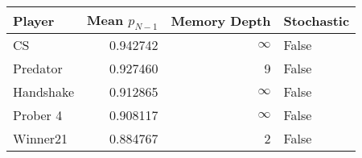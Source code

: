 \begin{tabular}{lrrl}
\toprule
    Player &  Mean $p_{N-1}$ &  Memory Depth & Stochastic \\
\midrule
        CS &        0.942742 &            \(\infty\) &      False \\
  Predator &        0.927460 &             9 &      False \\
 Handshake &        0.912865 &            \(\infty\) &      False \\
  Prober 4 &        0.908117 &            \(\infty\) &      False \\
  Winner21 &        0.884767 &             2 &      False \\
\bottomrule
\end{tabular}
